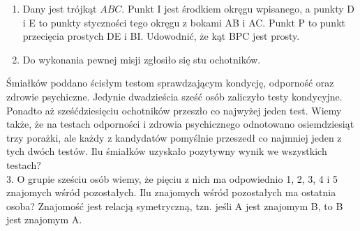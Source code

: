 \documentclass[10pt]{article}
\begin{document}
\begin{enumerate}
  \item Dany jest trójkąt \(A B C\). Punkt I jest środkiem okręgu wpisanego, a punkty D i E to punkty styczności tego okręgu z bokami AB i AC. Punkt P to punkt przecięcia prostych DE i BI. Udowodnić, że kąt BPC jest prosty.
  \item Do wykonania pewnej misji zgłosiło się stu ochotników.
\end{enumerate}

Śmiałków poddano ścisłym testom sprawdzającym kondycję, odporność oraz zdrowie psychiczne. Jedynie dwadzieścia sześć osób zaliczyło testy kondycyjne. Ponadto aż sześćdziesięciu ochotników przeszło co najwyżej jeden test. Wiemy także, że na testach odporności i zdrowia psychicznego odnotowano osiemdziesiąt trzy porażki, ale każdy z kandydatów pomyślnie przeszedł co najmniej jeden z tych dwóch testów. Ilu śmiałków uzyskało pozytywny wynik we wszystkich testach?\\
3. O grupie sześciu osób wiemy, że pięciu z nich ma odpowiednio 1, 2, 3, 4 i 5 znajomych wśród pozostałych. Ilu znajomych wśród pozostałych ma ostatnia osoba? Znajomość jest relacją symetryczną, tzn. jeśli A jest znajomym B, to B jest znajomym A.
\end{document}
